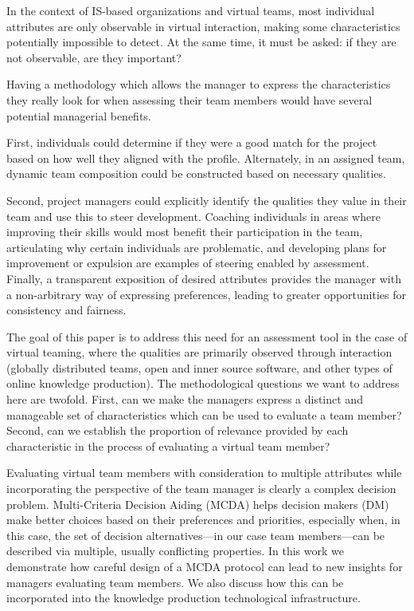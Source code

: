 In the context of IS-based organizations and virtual teams, most individual attributes are only observable in virtual
interaction, making some characteristics potentially impossible to detect. At the same time, it must be asked: if they are
not observable, are they important?

Having a methodology which allows the manager to express the characteristics they really look for when assessing their team members would have several potential managerial benefits.

First, individuals could determine if they were a good match for the project based on how well they aligned with the profile. Alternately, in an assigned team, dynamic team composition could be constructed based on necessary qualities. 

Second, project managers could explicitly identify the qualities they value in their team and use this to steer development. Coaching individuals in areas where improving their skills would most benefit their participation in the team, articulating why certain individuals are problematic, and developing plans for improvement or expulsion are examples of steering enabled by assessment. Finally, a transparent exposition of desired attributes provides the manager with a non-arbitrary way of expressing preferences, leading to greater opportunities for consistency and fairness. 

The goal of this paper is to address this need for an assessment tool in the case of virtual teaming, where 
the qualities are primarily observed through interaction (globally distributed teams, open and inner source software, 
and other types of online knowledge production).
The methodological questions we want to address here are twofold. First, can we make the managers express a distinct and manageable set of
characteristics which can be used to evaluate a team member? Second, can we establish the proportion of relevance provided by
each characteristic in the process of evaluating a virtual team member?

Evaluating virtual team members with consideration to multiple attributes while incorporating the perspective of the team manager is clearly a complex decision problem. Multi-Criteria Decision Aiding (MCDA) helps decision makers (DM) make better choices based on their preferences and priorities, especially when, in this case, the set of decision alternatives---in our case team members---can be described via multiple, usually conflicting properties.
In this work we demonstrate how careful design of a MCDA protocol can lead to new insights for managers evaluating team members.
We also discuss how this can be incorporated into the knowledge production technological infrastructure.

